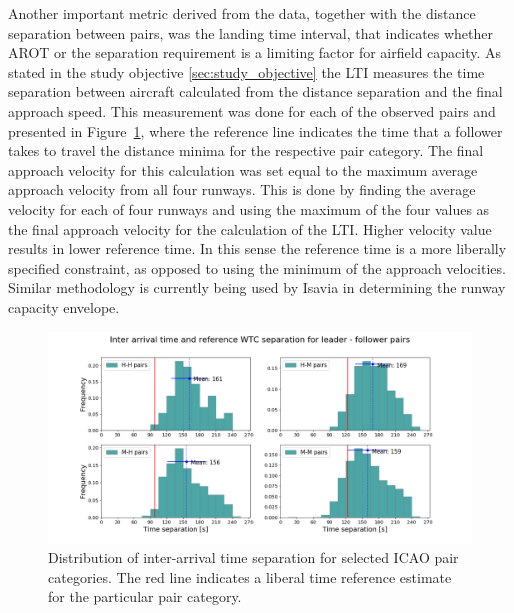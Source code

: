 Another important metric derived from the data, together with the distance separation between pairs, was the landing time interval, that indicates whether AROT or the separation requirement is a limiting factor for airfield capacity. As stated in the study objective \ref{sec:study_objective} the LTI measures the time separation between aircraft calculated from the distance separation and the final approach speed. This measurement was done for each of the observed pairs and presented in Figure~\ref{fig:time_separ_HH_HM_MH_MM_pairs}, where the reference line indicates the time that a follower takes to travel the distance minima for the respective pair category. The final approach velocity for this calculation was set equal to the maximum average approach velocity from all four runways. This is done by finding the average velocity for each of four runways and using the maximum of the four values as the final approach velocity for the calculation of the LTI. Higher velocity value results in lower reference time. In this sense the reference time is a more liberally specified constraint, as opposed to using the minimum of the approach velocities. Similar methodology is currently being used by Isavia in determining the runway capacity envelope.
\begin{figure}[h]
    \centering
    \includegraphics[width=1\textwidth]{graphics/fig_time_separ_HH_HM_MH_MM_pairs.png}
    \caption[Distribution of inter-arrival time separation for ICAO pairs]{Distribution of inter-arrival time separation for selected ICAO pair categories. The red line indicates a liberal time reference estimate for the particular pair category.}
    \label{fig:time_separ_HH_HM_MH_MM_pairs}
\end{figure}














